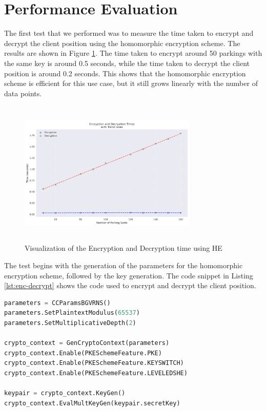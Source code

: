 \section{Performance Evaluation}

The first test that we performed was to measure the time taken to encrypt and decrypt the client position using the homomorphic encryption scheme. The results are shown in Figure \ref{fig:testing-enc}. The time taken to encrypt around 50 parkings with the same key is around 0.5 seconds, while the time taken to decrypt the client position is around 0.2 seconds. This shows that the homomorphic encryption scheme is efficient for this use case, but it still grows linearly with the number of data points.

\begin{figure}[h]
    \centering
    \includegraphics[width=8.5cm,height=7cm]{img/crypto_times.png}
    \caption{Visualization of the Encryption and Decryption time using HE}
    \label{fig:testing-enc}
\end{figure}

The test begins with the generation of the parameters for the homomorphic encryption scheme, followed by the key generation. The code snippet in Listing \ref{lst:enc-decrypt} shows the code used to encrypt and decrypt the client position.

\newpage

\begin{lstlisting}[language=python, caption={Encryption and Decryption of the client position}, label={lst:enc-decrypt}]
parameters = CCParamsBGVRNS()
parameters.SetPlaintextModulus(65537)
parameters.SetMultiplicativeDepth(2)

crypto_context = GenCryptoContext(parameters)
crypto_context.Enable(PKESchemeFeature.PKE)
crypto_context.Enable(PKESchemeFeature.KEYSWITCH)
crypto_context.Enable(PKESchemeFeature.LEVELEDSHE)

keypair = crypto_context.KeyGen()
crypto_context.EvalMultKeyGen(keypair.secretKey)
\end{lstlisting}


